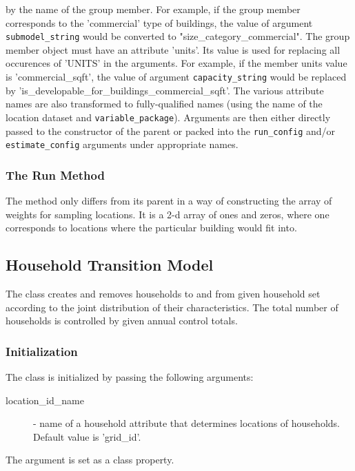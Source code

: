 by the name of the group member. For example, if the group member corresponds to the 'commercial' type of buildings,
the value of argument \verb|submodel_string| would be converted to "size_category_commercial".
The group member object must have an attribute 'units'. Its value is used for replacing all occurences of
'UNITS' in the arguments. For example, if the member units value is 'commercial_sqft', 
the value of argument \verb|capacity_string| would be replaced by  'is_developable_for_buildings_commercial_sqft'.
The various attribute names are also transformed to fully-qualified names (using the name of the location dataset and 
\verb|variable_package|). 
Arguments are then either directly passed to the constructor of the parent or packed into 
the \verb|run_config| and/or
\verb|estimate_config| arguments under appropriate names.
%

\subsubsection{The Run Method}
%
The  method only differs from its parent in a way of constructing the array of weights 
for sampling locations. It is a 2-d array of ones and zeros, where one corresponds to locations
where the particular building would fit into.

%
\subsection{Household Transition Model}
%
\label{sec:household-transition-model}

The class  
creates and removes households to and from given household set according to
the joint distribution of their characteristics. The total number of
households is controlled by given annual control totals.

\subsubsection{Initialization}
%
The class is initialized by passing the following arguments:
\begin{description}
\item[location_id_name] - name of a household attribute that determines locations of households.
  Default value is 'grid_id'.
\end{description}
The argument is set as a class property.

